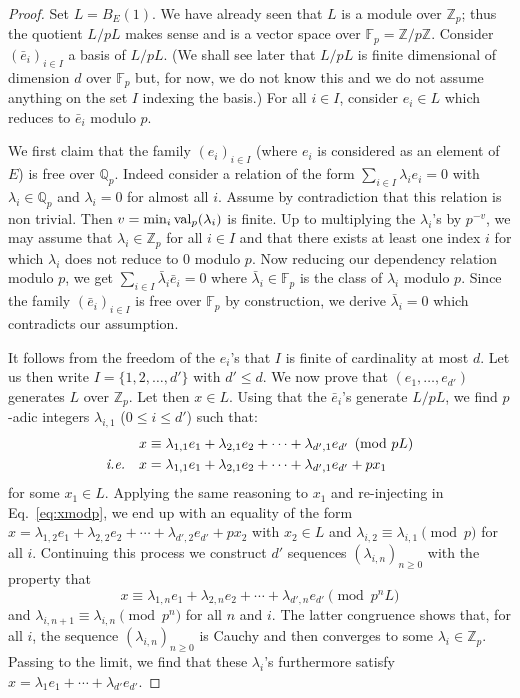 \documentclass[11pt]{article}
\numberwithin{equation}{section}
\numberwithin{figure}{section}
\renewcommand{\leq}{\leqslant}
\renewcommand{\geq}{\geqslant}
\theoremstyle{definition}
\newcommand{\Z}{\mathbb Z}
\newcommand{\Zp}{\Z_p}
\newcommand{\Q}{\mathbb Q}
\newcommand{\Qp}{\Q_p}
\newcommand{\F}{\mathbb F}
\newcommand{\Fp}{\F_p}
\renewcommand{\min}{\text{\rm min}}
\newcommand{\val}{\text{\rm val}}
\begin{document}
\begin{proof}
Set $L = B_E(1)$. We have already seen that $L$ is a module over $\Zp$; 
thus the quotient $L/pL$ makes sense and is a vector space over $\Fp = 
\Z/p\Z$. Consider $(\bar e_i)_{i \in I}$ a basis of $L/pL$. (We shall 
see later that $L/pL$ is finite dimensional of dimension $d$ over $\Fp$ 
but, for now, we do not know this and we do not assume anything on the 
set $I$ indexing the basis.) For all $i \in I$, consider $e_i \in L$
which reduces to $\bar e_i$ modulo $p$.

We first claim that the family $(e_i)_{i \in I}$ (where $e_i$ is
considered as an element
of $E$) is free over $\Qp$. Indeed consider a relation of the form
$\sum_{i \in I} \lambda_i e_i = 0$ with $\lambda_i \in \Qp$ and
$\lambda_i = 0$ for almost all $i$. Assume by contradiction that
this relation is non trivial. Then $v = \min_i \, \val_p(\lambda_i)$ is
finite. Up to multiplying the $\lambda_i$'s by $p^{-v}$, we may assume 
that $\lambda_i \in \Zp$ for all $i \in I$ and that there exists
at least one index $i$ for which $\lambda_i$ does not reduce to $0$
modulo $p$.
Now reducing our dependency relation modulo $p$, we get $\sum_{i \in I} 
\bar \lambda_i \bar e_i = 0$ where $\bar \lambda_i \in \Fp$ is the class 
of $\lambda_i$ modulo $p$. Since the family $(\bar e_i)_{i \in I}$ is free 
over $\Fp$ by construction, we derive $\bar \lambda_i = 0$ which
contradicts our assumption.

It follows from the freedom of the $e_i$'s that $I$ is finite of 
cardinality at most $d$. Let us then write $I = \{1, 2, \ldots, d'\}$ 
with $d' \leq d$. We now prove that $(e_1, \ldots, e_{d'})$ generates $L$ 
over $\Zp$. Let then $x \in L$. Using that the $\bar e_i$'s generate 
$L/pL$, we find $p$-adic integers $\lambda_{i,1}$ ($0 \leq i \leq d'$)
such that:
\begin{align}
x & \equiv \lambda_{1,1} e_1 + 
\lambda_{2,1} e_2 + \cdots + \lambda_{d',1} e_{d'} \pmod{pL} \nonumber\\
\text{\emph{i.e.}} \quad 
x & = \lambda_{1,1} e_1 +
\lambda_{2,1} e_2 + \cdots + \lambda_{d',1} e_{d'} + p x_1
\label{eq:xmodp}
\end{align}
for some $x_1 \in L$. Applying the same reasoning to $x_1$ and 
re-injecting in Eq.~\eqref{eq:xmodp}, we end up with an equality of
the form $x = \lambda_{1,2} e_1 +
\lambda_{2,2} e_2 + \cdots + \lambda_{d',2} e_{d'} + p x_2$
with $x_2 \in L$ and $\lambda_{i,2} \equiv \lambda_{i,1} \pmod p$
for all $i$. Continuing this process we construct $d'$ sequences 
$(\lambda_{i,n})_{n \geq 0}$ with the property that
$$x \equiv \lambda_{1,n} e_1 + 
\lambda_{2,n} e_2 + \cdots + \lambda_{d',n} e_{d'} \pmod{p^nL}$$
and $\lambda_{i,n+1} \equiv \lambda_{i,n} \pmod {p^n}$ for all $n$
and $i$. The latter congruence shows that, for all $i$, the sequence 
$(\lambda_{i,n})_{n \geq 0}$ is Cauchy and then converges
to some $\lambda_i \in \Zp$. Passing to the limit, we find that these 
$\lambda_i$'s furthermore satisfy $x = \lambda_1 e_1 + \cdots + 
\lambda_{d'} e_{d'}$.


\end{proof}
\end{document}
